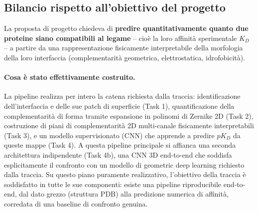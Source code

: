 \documentclass[11pt,a4paper]{article}
\begin{document}
\subsection{Bilancio rispetto all'obiettivo del progetto}
\label{sec:bilancio}

La proposta di progetto chiedeva di \textbf{predire quantitativamente quanto due proteine siano compatibili al legame} -- cioè la loro affinità sperimentale $K_D$ -- a partire da una rappresentazione fisicamente interpretabile della morfologia della loro interfaccia (complementarità geometrica, elettrostatica, idrofobicità).

\paragraph{Cosa è stato effettivamente costruito.} La pipeline realizza per intero la catena richiesta dalla traccia: identificazione dell'interfaccia e delle sue patch di superficie (Task 1), quantificazione della complementarità di forma tramite espansione in polinomi di Zernike 2D (Task 2), costruzione di piani di complementarità 2D multi-canale fisicamente interpretabili (Task 3), e un modello supervisionato (CNN) che apprende a predire $pK_D$ da queste mappe (Task 4). A questa pipeline principale si affianca una seconda architettura indipendente (Task 4b), una CNN 3D end-to-end che soddisfa esplicitamente il confronto con un modello di geometric deep learning richiesto dalla traccia. Su questo piano puramente realizzativo, l'obiettivo della traccia è soddisfatto in tutte le sue componenti: esiste una pipeline riproducibile end-to-end, dal dato grezzo (struttura PDB) alla predizione numerica di affinità, corredata di una baseline di confronto genuina.
\end{document}
